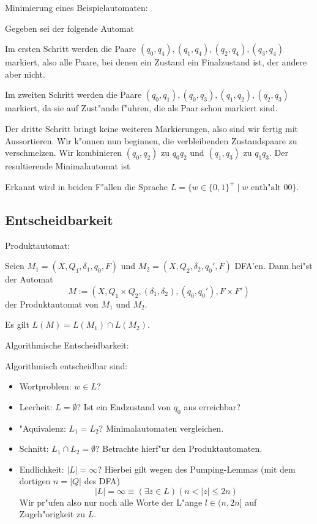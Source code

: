 \example Minimierung eines Beispielautomaten:{
  Gegeben sei der folgende Automat
  
  Im ersten Schritt werden die Paare $(q_0, q_4), (q_1, q_4), (q_2,
  q_4), (q_3, q_4)$ markiert, also alle Paare, bei denen ein Zustand ein
  Finalzustand ist, der andere aber nicht.
  
  Im zweiten Schritt werden die Paare $(q_0, q_1), (q_0, q_3), (q_1,
  q_2), (q_2, q_3)$ markiert, da sie auf Zust"ande f"uhren, die als Paar
  schon markiert sind.

  Der dritte Schritt bringt keine weiteren Markierungen, also sind wir
  fertig mit Aussortieren. Wir k"onnen nun beginnen, die verbleibenden
  Zustandspaare zu verschmelzen. Wir kombinieren $(q_0, q_2)$ zu
  $q_0q_2$ und $(q_1, q_3)$ zu $q_1q_3$. Der resultierende
  Minimalautomat ist
  
  Erkannt wird in beiden F"allen die Sprache 
  $L =\{w\in\{0,1\}^+\mid w\text{ enth"alt }00\}$.
  }
\subsection{Entscheidbarkeit}
\label{sub:decidability}
 Produktautomat:{
  Seien $M_1=(X,Q_1,\delta_1,q_0,F)$ und $M_2=(X,Q_2,\delta_2,q_0',F)$
  DFA'en. Dann hei"st der Automat
  \[M:=(X,Q_1\times Q_2,(\delta_1,\delta_2),(q_0,q_0'),F\times F')
    \]
  der Produktautomat von $M_1$ und $M_2$.
  
  Es gilt $L(M)=L(M_1)\cap L(M_2)$.
  }
\remark Algorithmische Entscheidbarkeit:{
  Algorithmisch entscheidbar sind:
  \begin{itemize}
    \item Wortproblem: $w\in L$?
    \item Leerheit: $L=\emptyset$? Ist ein Endzustand von $q_0$ aus
      erreichbar?
    \item "Aquivalenz: $L_1=L_2$? Minimalautomaten vergleichen.
    \item Schnitt: $L_1\cap L_2=\emptyset$? Betrachte hierf"ur den
      Produktautomaten.
    \item Endlichkeit: $|L|=\infty$? Hierbei gilt wegen des
      Pumping-Lemmas (mit dem dortigen $n=|Q|$ des DFA)
      \[|L| = \infty\equiv(\exists z \in L)(n<|z|\le 2n)
        \]
      Wir pr"ufen also nur noch alle Worte der L"ange $l \in (n, 2n]$ auf
      Zugeh"origkeit zu $L$.
    \end{itemize}
  }
